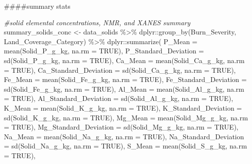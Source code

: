 \documentclass[
]{article}
\newenvironment{Shaded}{\begin{snugshade}}{\end{snugshade}}
\newcommand{\AttributeTok}[1]{\textcolor[rgb]{0.77,0.63,0.00}{#1}}
\newcommand{\CommentTok}[1]{\textcolor[rgb]{0.56,0.35,0.01}{\textit{#1}}}
\newcommand{\ConstantTok}[1]{\textcolor[rgb]{0.00,0.00,0.00}{#1}}
\newcommand{\FunctionTok}[1]{\textcolor[rgb]{0.00,0.00,0.00}{#1}}
\newcommand{\NormalTok}[1]{#1}
\newcommand{\OtherTok}[1]{\textcolor[rgb]{0.56,0.35,0.01}{#1}}
\newcommand{\SpecialCharTok}[1]{\textcolor[rgb]{0.00,0.00,0.00}{#1}}
\begin{document}
\#\#\#\#summary stats

\begin{Shaded}
\begin{Highlighting}[]
\CommentTok{\#solid elemental concentrations, NMR, and XANES summary}
\NormalTok{summary\_solids\_conc }\OtherTok{\textless{}{-}}\NormalTok{ data\_solids }\SpecialCharTok{\%\textgreater{}\%}
\NormalTok{  dplyr}\SpecialCharTok{::}\FunctionTok{group\_by}\NormalTok{(Burn\_Severity, Land\_Coverage\_Category) }\SpecialCharTok{\%\textgreater{}\%}
\NormalTok{  dplyr}\SpecialCharTok{::}\FunctionTok{summarize}\NormalTok{(}
    \AttributeTok{P\_Mean =} \FunctionTok{mean}\NormalTok{(Solid\_P\_g\_kg, }\AttributeTok{na.rm =} \ConstantTok{TRUE}\NormalTok{),}
    \AttributeTok{P\_Standard\_Deviation =} \FunctionTok{sd}\NormalTok{(Solid\_P\_g\_kg, }\AttributeTok{na.rm =} \ConstantTok{TRUE}\NormalTok{),}
    \AttributeTok{Ca\_Mean =} \FunctionTok{mean}\NormalTok{(Solid\_Ca\_g\_kg, }\AttributeTok{na.rm =} \ConstantTok{TRUE}\NormalTok{),}
    \AttributeTok{Ca\_Standard\_Deviation =} \FunctionTok{sd}\NormalTok{(Solid\_Ca\_g\_kg, }\AttributeTok{na.rm =} \ConstantTok{TRUE}\NormalTok{),}
    \AttributeTok{Fe\_Mean =} \FunctionTok{mean}\NormalTok{(Solid\_Fe\_g\_kg, }\AttributeTok{na.rm =} \ConstantTok{TRUE}\NormalTok{),}
    \AttributeTok{Fe\_Standard\_Deviation =} \FunctionTok{sd}\NormalTok{(Solid\_Fe\_g\_kg, }\AttributeTok{na.rm =} \ConstantTok{TRUE}\NormalTok{),}
    \AttributeTok{Al\_Mean =} \FunctionTok{mean}\NormalTok{(Solid\_Al\_g\_kg, }\AttributeTok{na.rm =} \ConstantTok{TRUE}\NormalTok{),}
    \AttributeTok{Al\_Standard\_Deviation =} \FunctionTok{sd}\NormalTok{(Solid\_Al\_g\_kg, }\AttributeTok{na.rm =} \ConstantTok{TRUE}\NormalTok{),}
    \AttributeTok{K\_Mean =} \FunctionTok{mean}\NormalTok{(Solid\_K\_g\_kg, }\AttributeTok{na.rm =} \ConstantTok{TRUE}\NormalTok{),}
    \AttributeTok{K\_Standard\_Deviation =} \FunctionTok{sd}\NormalTok{(Solid\_K\_g\_kg, }\AttributeTok{na.rm =} \ConstantTok{TRUE}\NormalTok{),}
    \AttributeTok{Mg\_Mean =} \FunctionTok{mean}\NormalTok{(Solid\_Mg\_g\_kg, }\AttributeTok{na.rm =} \ConstantTok{TRUE}\NormalTok{),}
    \AttributeTok{Mg\_Standard\_Deviation =} \FunctionTok{sd}\NormalTok{(Solid\_Mg\_g\_kg, }\AttributeTok{na.rm =} \ConstantTok{TRUE}\NormalTok{),}
    \AttributeTok{Na\_Mean =} \FunctionTok{mean}\NormalTok{(Solid\_Na\_g\_kg, }\AttributeTok{na.rm =} \ConstantTok{TRUE}\NormalTok{),}
    \AttributeTok{Na\_Standard\_Deviation =} \FunctionTok{sd}\NormalTok{(Solid\_Na\_g\_kg, }\AttributeTok{na.rm =} \ConstantTok{TRUE}\NormalTok{),}
    \AttributeTok{S\_Mean =} \FunctionTok{mean}\NormalTok{(Solid\_S\_g\_kg, }\AttributeTok{na.rm =} \ConstantTok{TRUE}\NormalTok{),}

\end{Highlighting}
\end{Shaded}
\end{document}
